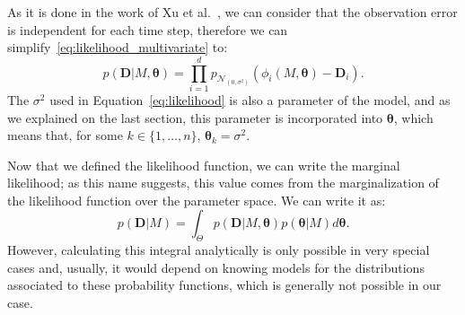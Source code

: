 As it is done in the work of Xu et al.~\cite{Xura20}, we can consider that the 
observation error is independent for each time step, 
therefore we can simplify~\ref{eq:likelihood_multivariate} to:
\begin{equation}
    p ({\bm D} | M, {\bm \theta}) = \prod_{i = 1}^d p_{\mathcal{N}_{\left(0, 
        \sigma^2\right)}} (\phi_i (M, {\bm \theta}) - {\bm D}_i).
\label{eq:likelihood}
\end{equation}
The $\sigma^2$ used in Equation~\ref{eq:likelihood} is also a parameter
of the model, and as we explained on the last section, this parameter is
incorporated into ${\bm \theta}$, which means that, for some $k \in \{1,
\ldots, n\}$, ${\bm \theta}_k = \sigma^2$.

Now that we defined the likelihood function, we can write the marginal 
likelihood; as this name suggests, this value comes from the
marginalization of the likelihood function over the parameter space. We
can write it as:
\begin{equation}
    p ({\bm D} | M) = \int_{\Theta} p ({\bm D} | M, {\bm \theta}) 
        p ({\bm \theta} | M)d{\bm\theta}.
\label{eq:marginal_likelihood}
\end{equation}
However, calculating this integral analytically is only possible in 
very special cases and, usually, it would depend on knowing models for 
the distributions associated to these probability functions, which is 
generally not possible in our case.

